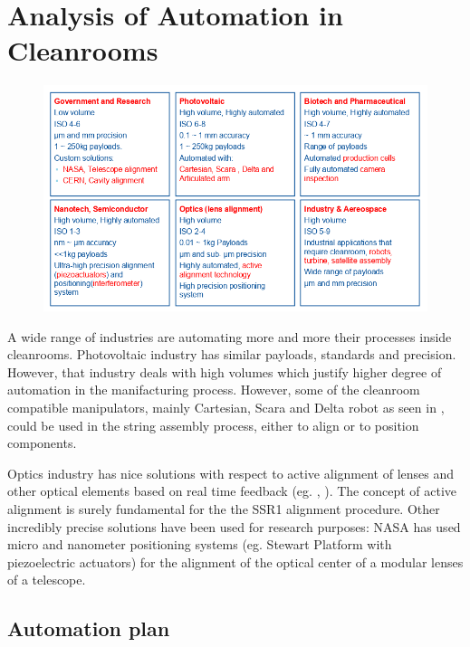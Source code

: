 \documentclass[12pt,a4paper]{article}
\begin{document}
\clearpage
\newpage

\section{Analysis of Automation in Cleanrooms}
\begin{figure}[h!]
\centering
\includegraphics[width=\textwidth]{27.png}
\end{figure}

A wide range of industries are automating more and more their processes inside cleanrooms. 
Photovoltaic industry has similar payloads, standards and precision. However, that industry deals with high volumes which justify higher degree of automation in the manifacturing process. However, some of the cleanroom compatible manipulators, mainly Cartesian, Scara and Delta robot as seen in \cite{AutomationPhotovoltaic}, could be used in the string assembly process, either to align or to position components. 


Optics industry has nice solutions with respect to active alignment of lenses and other optical elements based on real time feedback (eg. \cite{Overview_of_Active_Vision_Techniques},
\cite{adaptive_measurement}). The concept of active alignment is surely fundamental for the the SSR1 alignment procedure. Other incredibly precise solutions have been used for research purposes: NASA has used micro and nanometer positioning systems (eg. Stewart Platform with piezoelectric actuators) for the alignment of the optical center of a modular lenses of a telescope.

\clearpage
\newpage


\subsection{Automation plan}
\end{document}

